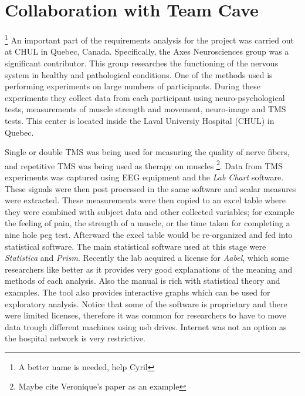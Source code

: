 
\section{Collaboration with Team Cave}

\footnote{A better name is needed, help Cyril} An important part of the requirements analysis for the project was carried out at CHUL in Quebec, Canada. Specifically, the Axes Neurosciences group was a significant contributor. This group researches the functioning of the nervous system in healthy and pathological conditions. One of the methods used is performing experiments on large numbers of participants. During these experiments they collect data from each participant using neuro-psychological tests, measurements of muscle strength and movement, neuro-image and TMS tests. This center is located inside the Laval Universiy Hospital (CHUL) in Quebec.

Single or double TMS was being used for measuring the quality of nerve fibers, and repetitive TMS was being used as therapy on muscles \footnote{Maybe cite Veronique's paper as an example}. Data from TMS experiments was captured using EEG equipment and the \emph{Lab Chart} software. These signals were then post processed in the same software and scalar measures were extracted. These measurements were then copied to an excel table where they were combined with subject data and other collected variables; for example the feeling of pain, the strength of a muscle, or the time taken for completing a nine hole peg test. Afterward the excel table would be re-organized and fed into statistical software. The main statistical software used at this stage were \emph{Statistica} and \emph{Prism}. Recently the lab acquired a license for \emph{Aabel}, which some researchers like better as it provides very good explanations of the meaning and methods of each analysis. Also the manual is rich with statistical theory and examples. The tool also provides interactive graphs which can be used for exploratory analysis. Notice that some of the software is proprietary and there were limited licenses, therefore it was common for researchers to have to move data trough different machines using usb drives. Internet was not an option as the hospital network is very restrictive.


